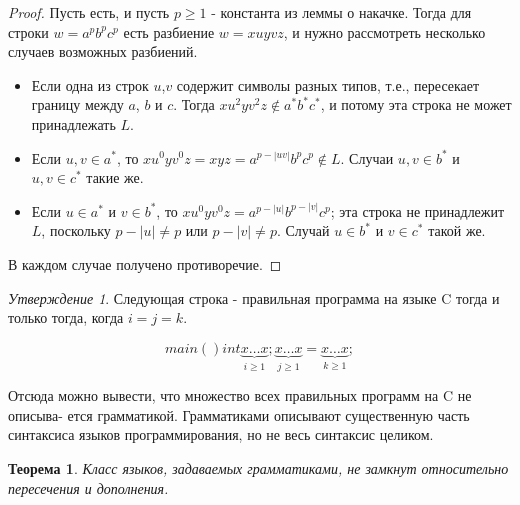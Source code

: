 \documentclass[a4paper]{article}
\theoremstyle{indented}
\newtheorem{theorem}{Теорема}
\theoremstyle{definition}
\theoremstyle{remark}
\newtheorem{stat}{Утверждение}
\begin{document}
\begin{proof}
    Пусть есть, и пусть $p \geq 1$ - константа из леммы о накачке. Тогда для строки $w = a^pb^pc^p$ есть разбиение $w = xuyvz$, и нужно рассмотреть несколько случаев возможных разбиений.

    \begin{itemize}
        \item Если одна из строк $u$,$v$ содержит символы разных типов, т.е., пересекает границу между $a$, $b$ и $c$. Тогда $xu^2yv^2z \notin a^*b^*c^*$, и потому эта строка не может принадлежать $L$.
        \item Если $u,v \in a^*$, то $xu^0yv^0z = xyz = a^{p-|uv|}b^pc^p \notin L$. Случаи $u,v \in b^*$ и $u,v \in c^*$ такие же.
        \item Если $u \in a^*$ и $v \in b^*$, то $xu^0yv^0z = a^{p-|u|}b^{p-|v|}c^p$; эта строка не принадлежит $L$, поскольку $p-|u|\neq p$ или $p-|v|\neq p$. Случай $u\in b^*$ и $v\in c^*$ такой же.
    \end{itemize}

    В каждом случае получено противоречие.
\end{proof}

\begin{stat}
    Следующая строка - правильная программа на языке C тогда и только тогда, когда $i = j = k$.

    \[
        main() { int \underbrace{x\ldots x}_{i \geq 1}; \underbrace{x\ldots x}_{j \geq 1} = \underbrace{x\ldots x}_{k \geq 1}; } 
    \]

    Отсюда можно вывести, что множество всех правильных программ на C не описыва- ется грамматикой. Грамматиками описывают существенную часть синтаксиса языков программирования, но не весь синтаксис целиком.
\end{stat}

\begin{theorem}
    Класс языков, задаваемых грамматиками, не замкнут относительно пересечения и дополнения.
\end{theorem}
\end{document}
